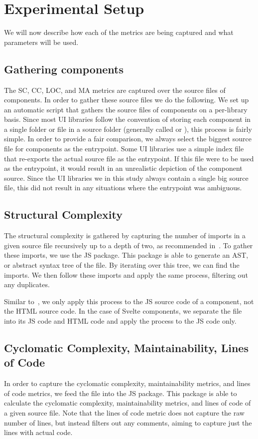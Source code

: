 \section{Experimental Setup}
We will now describe how each of the metrics are being captured and what parameters will be used.

\subsection{Gathering components}\label{sec:experimental-setup:gathering-components}
The SC, CC, LOC, and MA metrics are captured over the source files of components. In order to gather these source files we do the following. We set up an automatic script that gathers the source files of components on a per-library basis. Since most UI libraries follow the convention of storing each component in a single folder or file in a source folder (generally called  or ), this process is fairly simple. In order to provide a fair comparison, we always select the biggest source file for components as the entrypoint. Some UI libraries use a simple index file that re-exports the actual source file as the entrypoint. If this file were to be used as the entrypoint, it would result in an unrealistic depiction of the component source. Since the UI libraries we in this study always contain a single big source file, this did not result in any situations where the entrypoint was ambiguous.

\subsection{Structural Complexity}
The structural complexity is gathered by capturing the number of imports in a given source file recursively up to a depth of two, as recommended in~\cite{martinez-ortiz2016quality}. To gather these imports, we use the  JS package. This package is able to generate an AST, or abstract syntax tree of the file. By iterating over this tree, we can find the imports. We then follow these imports and apply the same process, filtering out any duplicates.

Similar to~\cite{martinez-ortiz2016quality}, we only apply this process to the JS source code of a component, not the HTML source code. In the case of Svelte components, we separate the file into its JS code and HTML code and apply the process to the JS code only.

\subsection{Cyclomatic Complexity, Maintainability, Lines of Code}
In order to capture the cyclomatic complexity, maintainability metrics, and lines of code metrics, we feed the file into the  JS package. This package is able to calculate the cyclomatic complexity, maintainability metrics, and lines of code of a given source file. Note that the lines of code metric does not capture the raw number of lines, but instead filters out any comments, aiming to capture just the lines with actual code.

